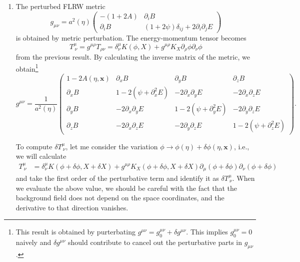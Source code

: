 \documentclass[a4paper,pdftex,10pt]{article}
\begin{document}
\begin{enumerate}
  \item
        The perturbed FLRW metric
        \begin{equation}
          g_{\mu\nu}
          =
          a^2(\eta)
          \begin{pmatrix}
            -(1+2A)       & \partial_{i}B                                   \\
            \partial_{i}B & (1+2\psi)\delta_{ij}+2\partial_{i}\partial_{j}E
          \end{pmatrix}
        \end{equation}
        is obtained by metric perturbation. The energy-momentum tensor becomes
        \begin{equation}
          T^{\mu}_{\ \nu}
          =
          g^{\mu\rho}T_{\rho\nu}
          =
          \delta^{\mu}_{\nu}K(\phi,X)
          +
          g^{\mu\rho}
          K_{X}
          \partial_{\rho}\phi\partial_{\nu}\phi
          \label{eqn:upperd_energy-momentum_tensor}
        \end{equation}
        from the previous result. By calculating the inverse matrix of the metric, we obtain\footnote{
          This result is obtained by purterbating $g^{\mu\nu}=g_{0}^{\mu\nu}+\delta g^{\mu\nu}$. This implies $g_{0}^{\mu\nu}=0$ naively and $\delta g^{\mu\nu}$ should contribute to cancel out the perturbative parts in $g_{\mu\nu}$.
        }
        \begin{equation}
          g^{\mu\nu}
          =
          \frac{1}{a^2(\eta)}
          \begin{pmatrix}
            1-2A(\eta,\bm{x}) & \partial_{x}B & \partial_{y}B & \partial_{z}B \\
            \partial_{x}B & 1-2(\psi+\partial_{x}^{2}E) & -2\partial_{x}\partial_{y}E & -2\partial_{x}\partial_{z}E \\
            \partial_{y}B & -2\partial_{x}\partial_{y}E & 1-2(\psi+\partial_{y}^{2}E) & -2\partial_{y}\partial_{z} E \\
            \partial_{z}B & -2\partial_{x}\partial_{z}E & -2\partial_{y}\partial_{z}E & 1-2(\psi+\partial_{z}^{2}E) 
          \end{pmatrix}
          .
        \end{equation}
        
        To compute $\delta T^{\mu}_{\ \nu}$, let me consider the variation $\phi\rightarrow\phi(\eta)+\delta\phi(\eta,\bm{x})$, i.e., we will calculate 
        \begin{align}
          T^{\mu}_{\ \nu}
          &=
          \delta^{\mu}_{\nu}
          K(\phi+\delta\phi, X+\delta X)
          +
          g^{\mu\rho}
          K_{X}(\phi+\delta\phi, X+\delta X)
          \partial_{\mu}(\phi+\delta\phi)
          \partial_{\nu}(\phi+\delta\phi)
          \label{eqn:T_def}
        \end{align} 
        and take the first order of the perturbative term and identify it as $\delta T^{\mu}_{\ \nu}$. When we evaluate the above value, we should be careful with the fact that the background field does not depend on the space coordinates, and the derivative to that direction vanishes. 


\end{enumerate}
\end{document}
